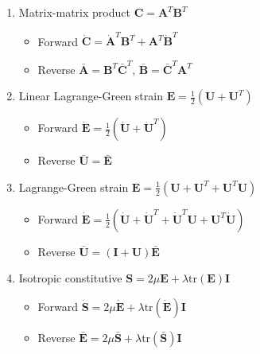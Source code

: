 \documentclass{article}
\begin{document}
\begin{enumerate}
        \item Matrix-matrix product $\mathbf{C} = \mathbf{A}^{T} \mathbf{B}^{T}$
        \begin{itemize}
            \item Forward $\dot{\mathbf{C}} = \dot{\mathbf{A}}^{T} \mathbf{B}^{T} + \mathbf{A}^{T} \dot{\mathbf{B}}^{T}$
            \item Reverse $\bar{\mathbf{A}} = \mathbf{B}^{T} \bar{\mathbf{C}}^{T} $, $\bar{\mathbf{B}} = \bar{\mathbf{C}}^{T} \mathbf{A}^{T}$
        \end{itemize}

        \item Linear Lagrange-Green strain $\mathbf{E} = \frac{1}{2} \left( \mathbf{U} + \mathbf{U}^{T} \right)$
        \begin{itemize}
            \item Forward $\dot{\mathbf{E}} = \frac{1}{2} \left( \dot{\mathbf{U}} + \dot{\mathbf{U}}^{T} \right)$
            \item Reverse $\bar{\mathbf{U}} = \bar{\mathbf{E}}$
        \end{itemize}

        \item Lagrange-Green strain $\mathbf{E} = \frac{1}{2} \left( \mathbf{U} + \mathbf{U}^{T} + \mathbf{U}^{T} \mathbf{U} \right)$
        \begin{itemize}
            \item Forward $\dot{\mathbf{E}} = \frac{1}{2} \left( \dot{\mathbf{U}} + \dot{\mathbf{U}}^{T} + \dot{\mathbf{U}}^{T} \mathbf{U} + \mathbf{U}^{T} \dot{\mathbf{U}} \right)$
            \item Reverse $\bar{\mathbf{U}} = (\mathbf{I} + \mathbf{U}) \bar{\mathbf{E}}$
        \end{itemize}

        \item Isotropic constitutive $\mathbf{S} = 2 \mu \mathbf{E} + \lambda \text{tr}(\mathbf{E}) \mathbf{I}$
        \begin{itemize}
            \item Forward $\dot{\mathbf{S}} = 2 \mu \dot{\mathbf{E}} + \lambda \text{tr}(\dot{\mathbf{E}}) \mathbf{I}$
            \item Reverse $\bar{\mathbf{E}} = 2 \mu \bar{\mathbf{S}} + \lambda \text{tr}(\bar{\mathbf{S}}) \mathbf{I}$
        \end{itemize}

    \end{enumerate}
\end{document}
